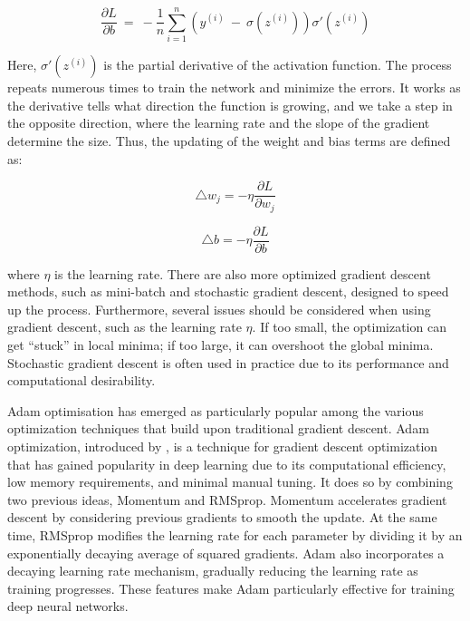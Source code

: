 \documentclass[12pt,a4paper]{article}
\begin{document}
\begin{equation}
  \frac{\partial L}{\partial b}\ =\ -\frac{1}{n}\sum_{i=1}^{n}\left(y^{\left(i\right)}\ -\ \sigma\left(z^{\left(i\right)}\right)\right)\sigma'\left(z^{\left(i\right)}\right)
\end{equation}

Here, $\sigma'\left(z^{\left(i\right)}\right)$ is the partial derivative of the activation function. The process repeats numerous times to train the network and minimize the errors. It works as the derivative tells what direction the function is growing, and we take a step in the opposite direction, where the learning rate and the slope of the gradient determine the size. Thus, the updating of the weight and bias terms are defined as:

\begin{equation}
  \triangle w_j = -\eta\frac{\partial L}{\partial w_j}
\end{equation}

\begin{equation}
  \triangle b = -\eta\frac{\partial L}{\partial b}
\end{equation}


where $\eta$ is the learning rate. There are also more optimized gradient descent methods, such as mini-batch and stochastic gradient descent, designed to speed up the process. Furthermore, several issues should be considered when using gradient descent, such as the learning rate $\eta$. If too small, the optimization can get “stuck” in local minima; if too large, it can overshoot the global minima. Stochastic gradient descent is often used in practice due to its performance and computational desirability.

Adam optimisation has emerged as particularly popular among the various optimization techniques that build upon traditional gradient descent. Adam optimization, introduced by \cite{Kingma2014AdamAM}, is a technique for gradient descent optimization that has gained popularity in deep learning due to its computational efficiency, low memory requirements, and minimal manual tuning. It does so by combining two previous ideas, Momentum and RMSprop. Momentum accelerates gradient descent by considering previous gradients to smooth the update. At the same time, RMSprop modifies the learning rate for each parameter by dividing it by an exponentially decaying average of squared gradients. Adam also incorporates a decaying learning rate mechanism, gradually reducing the learning rate as training progresses. These features make Adam particularly effective for training deep neural networks.
\end{document}
